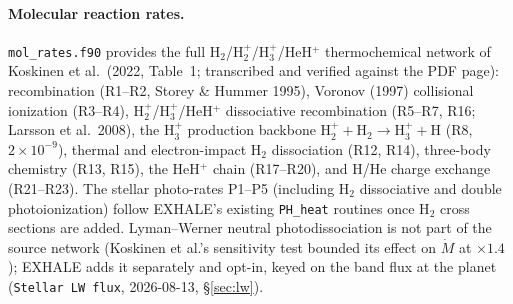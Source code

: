 \documentclass[english,a4paper]{my_memo}
\newcommand{\Mdot}{\dot{M}}
\begin{document}
\paragraph{Molecular reaction rates.} \texttt{mol\_rates.f90} provides the full
H$_2$/H$_2^+$/H$_3^+$/HeH$^+$ thermochemical network of Koskinen et al.\ (2022, Table~1;
transcribed and verified against the PDF page): recombination (R1--R2, Storey \& Hummer
1995), Voronov (1997) collisional ionization (R3--R4), H$_2^+$/H$_3^+$/HeH$^+$
dissociative recombination (R5--R7, R16; Larsson et al.\ 2008), the H$_3^+$ production
backbone H$_2^+ + \mathrm{H_2}\to \mathrm{H_3^+} + \mathrm{H}$ (R8, $2\times10^{-9}$),
thermal and electron-impact H$_2$ dissociation (R12, R14), three-body chemistry (R13,
R15), the HeH$^+$ chain (R17--R20), and H/He charge exchange (R21--R23). The stellar
photo-rates P1--P5 (including H$_2$ dissociative and double photoionization) follow
EXHALE's existing \texttt{PH\_heat} routines once H$_2$ cross sections are added.
Lyman--Werner neutral photodissociation is not part of the source network
(Koskinen et al.'s sensitivity test bounded its effect on $\Mdot$ at
$\times1.4$); EXHALE adds it separately and opt-in, keyed on the band flux at
the planet (\texttt{Stellar LW flux}, 2026-08-13, \S\ref{sec:lw}).
\end{document}
